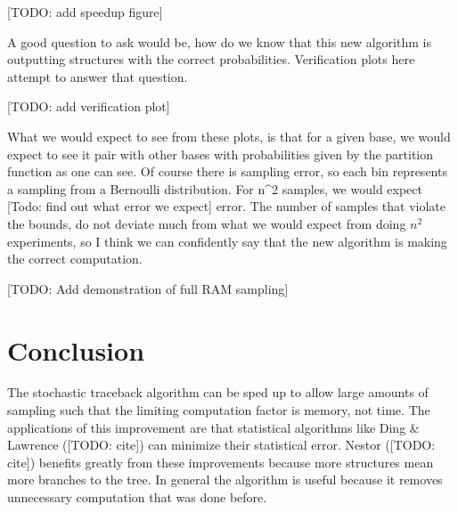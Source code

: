[TODO: add speedup figure]

A good question to ask would be, how do we know that this new
algorithm is outputting structures with the correct
probabilities. Verification plots here attempt to answer that
question.

[TODO: add verification plot]

What we would expect to see from these plots, is that for a given
base, we would expect to see it pair with other bases with
probabilities given by the partition function as one can see. Of
course there is sampling error, so each bin represents a sampling from
a Bernoulli distribution. For n^2 samples, we would expect [Todo: find
out what error we expect] error. The number of samples that violate
the bounds, do not deviate much from what we would expect from doing
$n^2$ experiments, so I think we can confidently say that the new
algorithm is making the correct computation.

[TODO: Add demonstration of full RAM sampling]

\section{Conclusion}

The stochastic traceback algorithm can be sped up to allow large
amounts of sampling such that the limiting computation factor is
memory, not time. The applications of this improvement are that
statistical algorithms like Ding \& Lawrence ([TODO: cite]) can
minimize their statistical error. Nestor ([TODO: cite]) benefits
greatly from these improvements because more structures mean more
branches to the tree. In general the algorithm is useful because it
removes unnecessary computation that was done before. 
